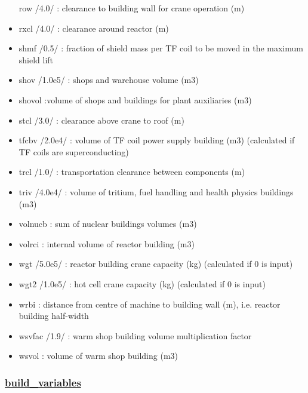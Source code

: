 \documentclass[]{article}
\begin{document}
\begin{itemize}
  row /4.0/ : clearance to building wall for crane operation (m)
\item
  rxcl /4.0/ : clearance around reactor (m)
\item
  shmf /0.5/ : fraction of shield mass per TF coil to be moved in the
  maximum shield lift
\item
  shov /1.0e5/ : shops and warehouse volume (m3)
\item
  shovol :volume of shops and buildings for plant auxiliaries (m3)
\item
  stcl /3.0/ : clearance above crane to roof (m)
\item
  tfcbv /2.0e4/ : volume of TF coil power supply building (m3)
  (calculated if TF coils are superconducting)
\item
  trcl /1.0/ : transportation clearance between components (m)
\item
  triv /4.0e4/ : volume of tritium, fuel handling and health physics
  buildings (m3)
\item
  volnucb : sum of nuclear buildings volumes (m3)
\item
  volrci : internal volume of reactor building (m3)
\item
  wgt /5.0e5/ : reactor building crane capacity (kg) (calculated if 0 is
  input)
\item
  wgt2 /1.0e5/ : hot cell crane capacity (kg) (calculated if 0 is input)
\item
  wrbi : distance from centre of machine to building wall (m), i.e.
  reactor building half-width
\item
  wsvfac /1.9/ : warm shop building volume multiplication factor
\item
  wsvol : volume of warm shop building (m3)
\end{itemize}

\subsubsection{\texorpdfstring{\href{build_variables.html}{build\_variables}}{build\_variables}}\label{build_variables}
\end{document}
